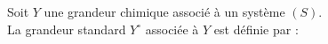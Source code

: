 ﻿\documentclass[a4paper]{article}
\begin{document}
\pagestyle{fancy}
\fancyhf{}
\setlength{\headheight}{15pt}

\begin{center}
	\large{}
\end{center}


Soit \(Y\) une grandeur chimique associé à un système \((S)\).\\
La grandeur standard \(Y^{\circ}\) associée à \(Y\) est définie par :\begin{center}
\end{center}
\end{document}
